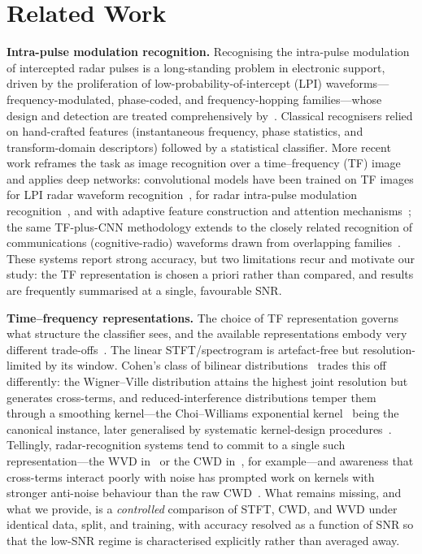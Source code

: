 \documentclass[journal]{IEEEtran}
\begin{document}
\section{Related Work}
\label{sec:related}
\textbf{Intra-pulse modulation recognition.} Recognising the intra-pulse
modulation of intercepted radar pulses is a long-standing problem in electronic
support, driven by the proliferation of low-probability-of-intercept (LPI)
waveforms---frequency-modulated, phase-coded, and frequency-hopping
families---whose design and detection are treated comprehensively
by~\cite{pace2009lpi}. Classical recognisers relied on hand-crafted features
(instantaneous frequency, phase statistics, and transform-domain descriptors)
followed by a statistical classifier. More recent work reframes the task as image
recognition over a time--frequency (TF) image and applies deep networks:
convolutional models have been trained on TF images for LPI radar waveform
recognition~\cite{kong2018cnn,huynhthe2021cwdtfa,huynhthe2021danet}, for radar
intra-pulse modulation recognition~\cite{qu2018intrapulse}, and with adaptive
feature construction and attention mechanisms~\cite{huang2023lpi}; the same
TF-plus-CNN methodology extends to the closely related recognition of
communications (cognitive-radio) waveforms drawn from overlapping
families~\cite{zhang2017cnn}. These systems report strong accuracy, but two
limitations recur and motivate our study: the TF representation is chosen a priori
rather than compared, and results are frequently summarised at a single,
favourable SNR.

\textbf{Time--frequency representations.} The choice of TF representation governs
what structure the classifier sees, and the available representations embody very
different trade-offs~\cite{boashash2016}. The linear STFT/spectrogram is
artefact-free but resolution-limited by its window. Cohen's class of bilinear
distributions~\cite{cohen1989} trades this off differently: the Wigner--Ville
distribution attains the highest joint resolution but generates cross-terms, and
reduced-interference distributions temper them through a smoothing kernel---the
Choi--Williams exponential kernel~\cite{choi1989} being the canonical instance,
later generalised by systematic kernel-design procedures~\cite{jeong1992kernel}.
Tellingly, radar-recognition systems tend to commit to a single such
representation---the WVD in~\cite{huynhthe2021danet} or the CWD
in~\cite{huynhthe2021cwdtfa}, for example---and awareness that cross-terms interact
poorly with noise has prompted work on kernels with stronger anti-noise behaviour
than the raw CWD~\cite{qu2018intrapulse}. What remains missing, and what we
provide, is a \emph{controlled} comparison of STFT, CWD, and WVD under identical
data, split, and training, with accuracy resolved as a function of SNR so that the
low-SNR regime is characterised explicitly rather than averaged away.
\end{document}
